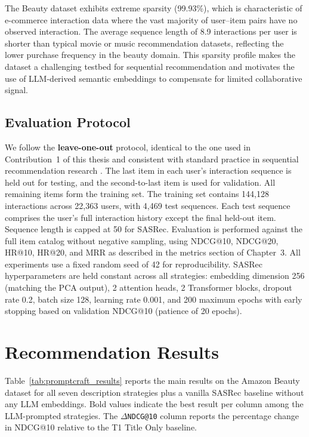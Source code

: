 \documentclass[12pt,a4paper]{report}
\begin{document}
\noindent The Beauty dataset exhibits extreme sparsity (99.93\%), which is
characteristic of e-commerce interaction data where the vast majority of
user--item pairs have no observed interaction. The average sequence length of
8.9 interactions per user is shorter than typical movie or music recommendation
datasets, reflecting the lower purchase frequency in the beauty domain. This
sparsity profile makes the dataset a challenging testbed for sequential
recommendation and motivates the use of LLM-derived semantic embeddings to
compensate for limited collaborative signal.

\subsection*{Evaluation Protocol}

\justifying
We follow the \textbf{leave-one-out} protocol, identical to the one used in
Contribution~1 of this thesis and consistent with standard practice in
sequential recommendation research \citep{kang2018sasrec,sun2019bert4rec}. The
last item in each user's interaction sequence is held out for testing, and the
second-to-last item is used for validation. All remaining items form the
training set. The training set contains 144,128 interactions across 22,363
users, with 4,469 test sequences. Each test sequence comprises the user's full
interaction history except the final held-out item. Sequence length is capped
at 50 for SASRec. Evaluation is performed against the full item catalog without
negative sampling, using NDCG@10, NDCG@20, HR@10, HR@20, and MRR as described
in the metrics section of Chapter~3. All experiments use a fixed random seed of
42 for reproducibility. SASRec hyperparameters are held constant across all
strategies: embedding dimension 256 (matching the PCA output), 2 attention
heads, 2 Transformer blocks, dropout rate 0.2, batch size 128, learning rate
0.001, and 200 maximum epochs with early stopping based on validation NDCG@10
(patience of 20 epochs).

\section{Recommendation Results}
\label{sec:pc_results}

\justifying
Table~\ref{tab:promptcraft_results} reports the main results on the Amazon
Beauty dataset for all seven description strategies plus a vanilla SASRec
baseline without any LLM embeddings. Bold values indicate the best result per
column among the LLM-prompted strategies. The \(\Delta\)\texttt{NDCG@10} column
reports the percentage change in NDCG@10 relative to the T1 Title Only
baseline.
\end{document}
